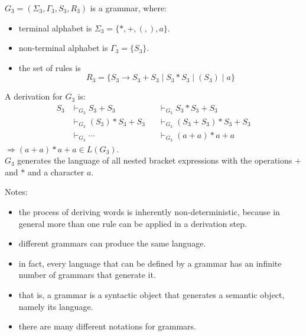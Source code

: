 \documentclass[a4paper,11pt,utf8]{article}
\begin{document}
\begin{tcolorbox}[title=example 4,colback=white,colframe=black,width=\textwidth,arc=0pt]
    $G_3 = (\Sigma_3,\Gamma_3,S_3,R_3)$ is a grammar, where:
    \begin{itemize}
        \item terminal alphabet is $\Sigma_3 = \{*,+,(,),a\}$.
        \item non-terminal alphabet is $\Gamma_3 = \{S_3\}$.
        \item the set of rules is \[
            R_3 = \{S_3 \to S_3 + S_3 \mid S_3 * S_3 \mid (S_3) \mid a\}
        \]
    \end{itemize}
    A derivation for $G_3$ is:
    \[
        \begin{aligned}
            S_3 &\vdash_{G_3} S_3 + S_3 &&\vdash_{G_3} S_3 * S_3 + S_3 \\[1ex]
                &\vdash_{G_3} (S_3) * S_3 + S_3 &&\vdash_{G_3} (S_3 + S_3) * S_3 + S_3 \\[1ex]
                &\vdash_{G_3} \cdots &&\vdash_{G_3} (a + a) * a + a
        \end{aligned}
    \]
    \lineindent $\Rightarrow (a + a) * a + a \in L(G_3)$. \\
    \lineindent $G_3$ generates the language of all nested bracket expressions with the operations $+$ and $*$ and a character $a$.
\end{tcolorbox}
Notes:
\begin{itemize}
    \item the process of deriving words is inherently non-deterministic, because in general more than one rule can be applied in a derivation step.
    \item different grammars can produce the same language.
    \item in fact, every language that can be defined by a grammar has an infinite number of grammars that generate it.
    \item that is, a grammar is a syntactic object that generates a semantic object, namely its language.
    \item there are many different notations for grammars.
\end{itemize}
\end{document}
